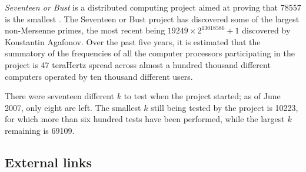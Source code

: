\documentclass[12pt]{article}
\begin{document}
{\em Seventeen or Bust} is a distributed computing project aimed at proving that 78557 is the smallest . The Seventeen or Bust project has discovered some of the largest non-Mersenne primes, the most recent being $19249 \times 2^{13018586} + 1$ discovered by Konstantin Agafonov. Over the past five years, it is estimated that the summatory of the frequencies of all the computer processors participating in the project is 47 teraHertz spread across almost a hundred thousand different computers operated by ten thousand different users.

There were seventeen different $k$ to test when the project started; as of June 2007, only eight are left. The smallest $k$ still being tested by the project is 10223, for which more than six hundred tests have been performed, while the largest $k$ remaining is 69109.

\subsection{External links}
\end{document}
